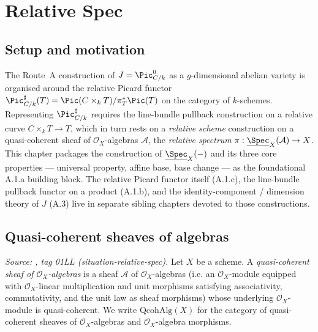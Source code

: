 \chapter{Relative Spec}
\label{chap:Picard_RelativeSpec}

\section{Setup and motivation}
\label{sec:relspec_setup}

The Route~A construction of \(J = \Pic^0_{C/k}\) as a \(g\)-dimensional abelian variety is
organised around the relative Picard functor
\(\Pic^\sharp_{C/k}(T) = \Pic(C \times_k T) / \pi_T^* \Pic(T)\)
on the category of \(k\)-schemes. Representing \(\Pic^\sharp_{C/k}\) requires the line-bundle
pullback construction on a relative curve \(C \times_k T \to T\), which in turn rests on a
\emph{relative scheme} construction on a quasi-coherent sheaf of \(\mathcal{O}_X\)-algebras
\(\mathcal{A}\), the \emph{relative spectrum}
\(\pi : \underline{\Spec}_X(\mathcal{A}) \to X\). This chapter packages the construction
of \(\underline{\Spec}_X(-)\) and its three core properties --- universal property, affine
base, base change --- as the foundational A.1.a building block. The relative Picard
functor itself (A.1.c), the line-bundle pullback functor on a product (A.1.b), and the
identity-component / dimension theory of \(J\) (A.3) live in separate sibling chapters
devoted to those constructions.

\section{Quasi-coherent sheaves of algebras}
\label{sec:qc_sheaf_of_algebras}

\begin{definition}
  \label{def:qc_sheaf_of_algebras}
  \textit{Source: \cite{stacks-project}, tag 01LL (situation-relative-spec).}
  Let \(X\) be a scheme. A \emph{quasi-coherent sheaf of \(\mathcal{O}_X\)-algebras} is a
  sheaf \(\mathcal{A}\) of \(\mathcal{O}_X\)-algebras (i.e. an \(\mathcal{O}_X\)-module
  equipped with \(\mathcal{O}_X\)-linear multiplication and unit morphisms satisfying
  associativity, commutativity, and the unit law as sheaf morphisms) whose underlying
  \(\mathcal{O}_X\)-module is quasi-coherent. We write \(\mathrm{QcohAlg}(X)\) for the
  category of quasi-coherent sheaves of \(\mathcal{O}_X\)-algebras and
  \(\mathcal{O}_X\)-algebra morphisms.
\end{definition}

